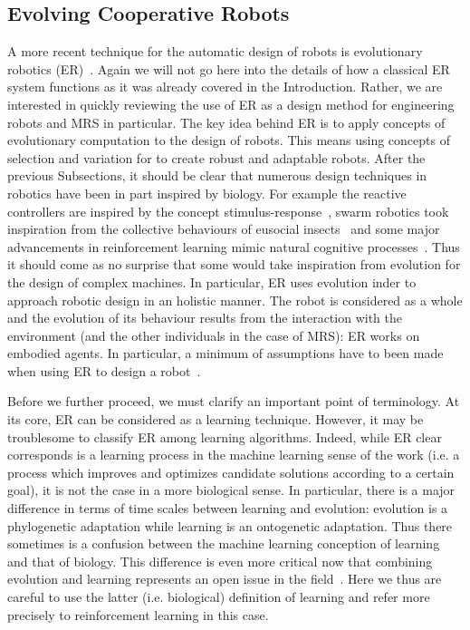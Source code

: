 
  \subsection{Evolving Cooperative Robots}

    A more recent technique for the automatic design of robots is evolutionary robotics (ER)~\parencite{Nolfi2000, Doncieux2015a}. Again we will not go here into the details of how a classical ER system functions as it was already covered in the Introduction. Rather, we are interested in quickly reviewing the use of ER as a design method for engineering robots and MRS in particular. The key idea behind ER is to apply concepts of evolutionary computation to the design of robots. This means using concepts of selection and variation for to create robust and adaptable robots. After the previous Subsections, it should be clear that numerous design techniques in robotics have been in part inspired by biology. For example the reactive controllers are inspired by the concept stimulus-response~\parencite{Brooks1986}, swarm robotics took inspiration from the collective behaviours of eusocial insects~\parencite{Bonabeau1999} and some major advancements in reinforcement learning mimic natural cognitive processes~\parencite{Montague1996}. Thus it should come as no surprise that some would take inspiration from evolution for the design of complex machines. In particular, ER uses evolution inder to approach robotic design in an holistic manner. The robot is considered as a whole and the evolution of its behaviour results from the interaction with the environment (and the other individuals in the case of MRS): ER works on embodied agents. In particular, a minimum of assumptions have to been made when using ER to design a robot~\parencite{Bongard2013a}.

    Before we further proceed, we must clarify an important point of terminology. At its core, ER can be considered as a learning technique. However, it may be troublesome to classify ER among learning algorithms. Indeed, while ER clear corresponds is a learning process in the machine learning sense of the work (i.e. a process which improves and optimizes candidate solutions according to a certain goal), it is not the case in a more biological sense. In particular, there is a major difference in terms of time scales between learning and evolution: evolution is a phylogenetic adaptation while learning is an ontogenetic adaptation. Thus there sometimes is a confusion between the machine learning conception of learning and that of biology. This difference is even more critical now that combining evolution and learning represents an open issue in the field~\parencite{Urzelai2001, Mouret2014, Doncieux2015a}. Here we thus are careful to use the latter (i.e. biological) definition of learning and refer more precisely to reinforcement learning in this case.

